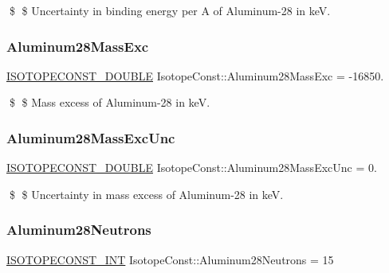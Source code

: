 \$ \$ Uncertainty in binding energy per A of Aluminum-\/28 in keV. \mbox{\label{group___isotope_const-_aluminum-_al28_ga9b9d01a84fc594ad624548a40929254d}} 
\subsubsection{\texorpdfstring{Aluminum28\+Mass\+Exc}{Aluminum28MassExc}}
{\footnotesize\ttfamily \mbox{\hyperlink{group___isotope_const-_macros_ga8f45a7272ce02c0b4c65c44636ed719a}{I\+S\+O\+T\+O\+P\+E\+C\+O\+N\+S\+T\+\_\+\+D\+O\+U\+B\+LE}} Isotope\+Const\+::\+Aluminum28\+Mass\+Exc = -\/16850.}

\$ \$ Mass excess of Aluminum-\/28 in keV. \mbox{\label{group___isotope_const-_aluminum-_al28_gae9f6a5296350b7678cc0b55d605312c0}} 
\subsubsection{\texorpdfstring{Aluminum28\+Mass\+Exc\+Unc}{Aluminum28MassExcUnc}}
{\footnotesize\ttfamily \mbox{\hyperlink{group___isotope_const-_macros_ga8f45a7272ce02c0b4c65c44636ed719a}{I\+S\+O\+T\+O\+P\+E\+C\+O\+N\+S\+T\+\_\+\+D\+O\+U\+B\+LE}} Isotope\+Const\+::\+Aluminum28\+Mass\+Exc\+Unc = 0.}

\$ \$ Uncertainty in mass excess of Aluminum-\/28 in keV. \mbox{\label{group___isotope_const-_aluminum-_al28_ga5ec94b738ce161d4f73be678e4ff5086}} 
\subsubsection{\texorpdfstring{Aluminum28\+Neutrons}{Aluminum28Neutrons}}
{\footnotesize\ttfamily \mbox{\hyperlink{group___isotope_const-_macros_ga5f18360b3e99483a35c32d789e62621c}{I\+S\+O\+T\+O\+P\+E\+C\+O\+N\+S\+T\+\_\+\+I\+NT}} Isotope\+Const\+::\+Aluminum28\+Neutrons = 15}

